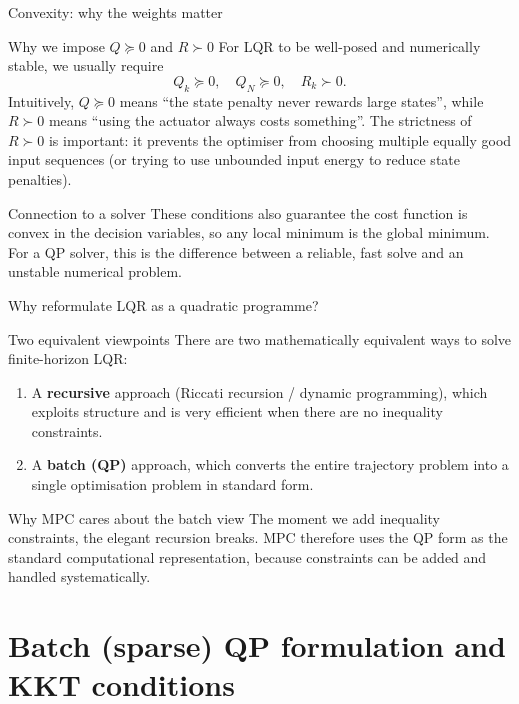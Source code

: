 \documentclass[aspectratio=169,11pt]{beamer}
\begin{document}
\begin{frame}{Convexity: why the weights matter}
\begin{block}{Why we impose $Q\succeq 0$ and $R\succ 0$}
For LQR to be well-posed and numerically stable, we usually require
\[
Q_k\succeq 0,\quad Q_N\succeq 0,\quad R_k\succ 0.
\]
Intuitively, $Q\succeq 0$ means ``the state penalty never rewards large states'', while $R\succ 0$ means ``using the actuator always costs something''. The strictness of $R\succ 0$ is important: it prevents the optimiser from choosing multiple equally good input sequences (or trying to use unbounded input energy to reduce state penalties).
\end{block}

\begin{alertblock}{Connection to a solver}
These conditions also guarantee the cost function is convex in the decision variables, so any local minimum is the global minimum. For a QP solver, this is the difference between a reliable, fast solve and an unstable numerical problem.
\end{alertblock}
\end{frame}

\begin{frame}{Why reformulate LQR as a quadratic programme?}
\begin{block}{Two equivalent viewpoints}
There are two mathematically equivalent ways to solve finite-horizon LQR:
\begin{enumerate}
  \item A \textbf{recursive} approach (Riccati recursion / dynamic programming), which exploits structure and is very efficient when there are no inequality constraints.
  \item A \textbf{batch (QP)} approach, which converts the entire trajectory problem into a single optimisation problem in standard form.
\end{enumerate}
\end{block}

\begin{block}{Why MPC cares about the batch view}
The moment we add inequality constraints, the elegant recursion breaks. MPC therefore uses the QP form as the standard computational representation, because constraints can be added and handled systematically.
\end{block}
\end{frame}

\section{Batch (sparse) QP formulation and KKT conditions}
\end{document}

